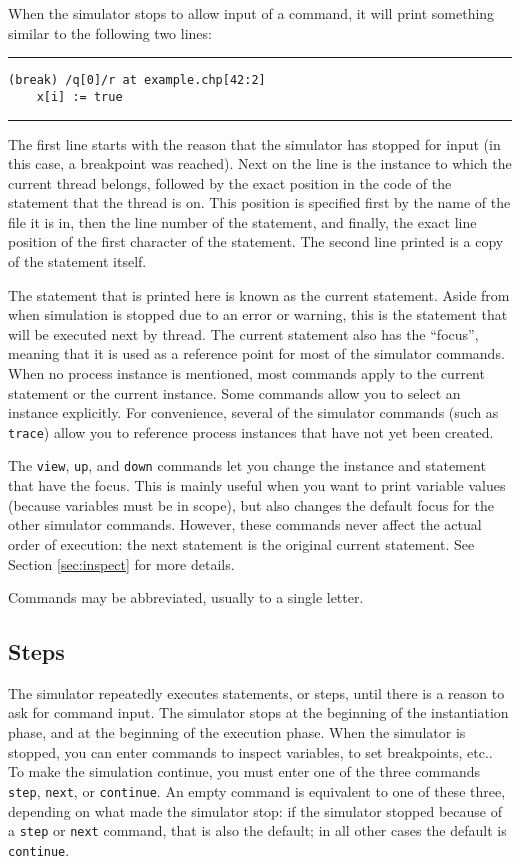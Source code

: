 When the simulator stops to allow input of a command, it will print something
similar to the following two lines:
\medskip
\hrule
\begin{verbatim}
(break) /q[0]/r at example.chp[42:2]
	x[i] := true
\end{verbatim}
\hrule
\medskip
The first line starts with the reason that the simulator has stopped for
input (in this case, a breakpoint was reached).  Next on the line is the
instance to which the current thread belongs, followed by the exact
position in the code of the statement that the thread is on.  This
position is specified first by the name of the file it is in, then the
line number of the statement, and finally, the exact line position of the
first character of the statement.  The second line printed is a copy of
the statement itself.

The statement that is printed here is known as the current statement.
Aside from when simulation is stopped due to an error or warning, this
is the statement that will be executed next by thread.  The current
statement also has the ``focus'', meaning that it is used as a reference
point for most of the simulator commands. When no process instance is mentioned,
most commands apply to the current statement or the current instance.
Some commands allow you to select an instance explicitly. For convenience,
several of the simulator commands (such as \verb|trace|) allow
you to reference process instances that have not yet been created.

The \verb|view|, \verb|up|, and \verb|down| commands let you change the instance and statement
that have the focus. This is mainly useful when you want to print
variable values (because variables must be in scope), but also changes
the default focus for the other simulator commands. However, these commands
never affect the actual order of execution: the next statement is the
original current statement. See Section \ref{sec:inspect} for more details.

Commands may be abbreviated, usually to a single letter.


\subsection{Steps}\label{sec:steps}

The simulator repeatedly executes statements, or steps, until there is a
reason to ask for command input. The simulator stops at the beginning of
the instantiation phase, and at the beginning of the execution phase.
When the simulator is stopped, you can enter commands to inspect
variables, to set breakpoints, etc.. To make
the simulation continue, you must enter one of the three commands
\verb|step|, \verb|next|, or \verb|continue|. An empty command is equivalent to one
of these three, depending on what made the simulator stop: if the simulator
stopped because of a \verb|step| or \verb|next| command, that is also the default;
in all other cases the default is \verb|continue|.

